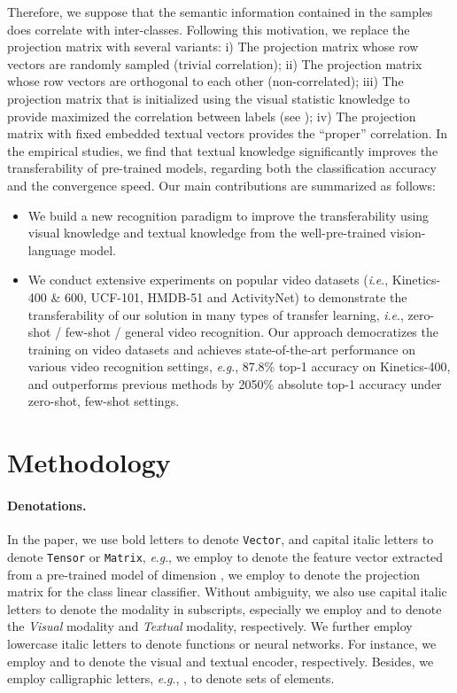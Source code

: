 \documentclass[letterpaper]{article} \usepackage{aaai23}  \usepackage{times}  \usepackage{helvet}  \usepackage{courier}  \usepackage[hyphens]{url}  \usepackage{graphicx} \urlstyle{rm} \def\UrlFont{\rm}  \usepackage{natbib}  \usepackage{caption} \frenchspacing  \setlength{\pdfpagewidth}{8.5in}  \setlength{\pdfpageheight}{11in}  \usepackage{algorithm}
\newcommand{\ie}{\textit{i}.\textit{e}.}
\newcommand{\eg}{\textit{e}.\textit{g}.}
\begin{document}
Therefore, we suppose that the semantic information contained in the samples does correlate with inter-classes. Following this motivation, we replace the projection matrix with several variants: i) The projection matrix whose row vectors are randomly sampled (trivial correlation); ii) The projection matrix whose row vectors are orthogonal to each other (non-correlated); iii) The projection matrix that is initialized using the visual statistic knowledge to provide maximized the correlation between labels (see ); iv) The projection matrix with fixed embedded textual vectors provides the ``proper'' correlation. In the empirical studies, we find that textual knowledge significantly improves the transferability of pre-trained models, regarding both the classification accuracy and the convergence speed. 
Our main contributions are summarized as follows:
\begin{itemize}
\item We build a new recognition paradigm to improve the transferability using visual knowledge and textual knowledge from the well-pre-trained vision-language model.
    \item We conduct extensive experiments on popular video datasets (\ie, Kinetics-400 \& 600, UCF-101, HMDB-51 and ActivityNet) to demonstrate the transferability of our solution in many types of transfer learning, \ie, zero-shot / few-shot / general video recognition. 
    Our approach democratizes the training on video datasets and achieves state-of-the-art performance on various video recognition settings, \eg, 87.8\% top-1 accuracy on Kinetics-400, and outperforms previous methods by 2050\% absolute top-1 accuracy under zero-shot, few-shot settings.

\end{itemize}


 


\section{Methodology}



\paragraph{Denotations.}
In the paper, we use bold letters to denote \texttt{Vector}, and capital italic letters to denote \texttt{Tensor} or \texttt{Matrix}, \eg, we employ  to denote the feature vector extracted from a pre-trained model of dimension , we employ  to denote the projection matrix for the class linear classifier. 
Without ambiguity, we also use capital italic letters to denote the modality in subscripts, especially we employ  and  to denote the \textit{Visual} modality and \textit{Textual} modality, respectively. 
We further employ lowercase italic letters to denote functions or neural networks. For instance, we employ  and  to denote the visual and textual encoder, respectively. 
Besides, we employ calligraphic letters, \eg, , to denote sets of elements.
\end{document}
